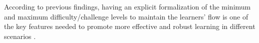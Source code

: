 According to previous findings, having an explicit formalization of the minimum and maximum difficulty/challenge levels to maintain the learners' flow is one of the key features needed to promote more effective and robust learning in different scenarios \cite{Esteban-MillatMartinez-LopezHuertas-GarciaMeseguerRodriguez-Ardura2014, FulmerD'MelloStrainGraesser2015 ,LinehanBellordKirmanMorfordRoche2014}. 





